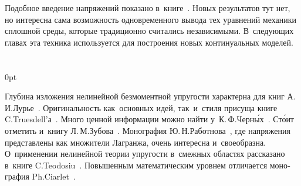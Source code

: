 \begin{otherlanguage}{russian}


Подобное введение напряжений показано в~книге~\cite{rabotnov-mechanicsofdeformable}. Новых результатов тут нет, но интересна сама возможность одновременного вывода тех уравнений механики сплошной среды, которые традиционно считались независимыми. В~следующих главах эта техника используется для построения новых континуальных моделей.

\section*{\small \wordforbibliography}

\begin{changemargin}{\parindent}{0pt}
\fontsize{10}{12}\selectfont

Глубина изложения нелинейной безмоментной упругости характерна для книг А.\,И.\:Лурье~\cite{lurie-nonlinearelasticity, lurie-theoryofelasticity}. Оригинальность как~основных идей, так~и~стиля присуща книге C.\:Truesdell’а~\cite{truesdell-firstcourse}. Много ценной информации можно найти у~К.\,Ф.\:Черн\'{ы}х~\cite{chernyh-nonlinearelasticity}. Ст\'{о}ит отметить и~книгу Л.\,М.\:Зубова~\cite{zubov}. Монография Ю.\,Н.\:Работнова~\cite{rabotnov-mechanicsofdeformable}, где напряжения представлены как множители Лагранжа, очень интересна и~своеобразна. О~применении нелинейной теории упругости в~смежных областях рассказано в~книге C.\:Teodosiu~\cite{teodosiu-crystaldefects}. Повышенным математическим уровнем отличается монография Ph.\:Ciarlet~\cite{ciarlet-mathematicalelasticity}.
\par

\end{changemargin}

\end{otherlanguage}

